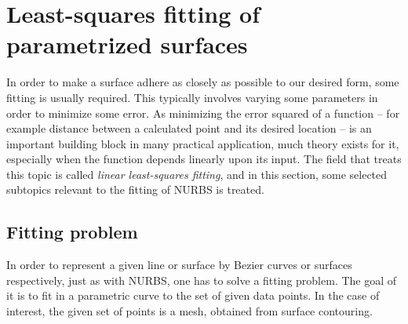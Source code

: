 \section{Least-squares fitting of parametrized surfaces}
In order to make a surface adhere as closely as possible to our desired form, some fitting is usually required. This typically involves varying some parameters in order to minimize some error. As minimizing the error squared of a function -- for example distance between a calculated point and its desired location -- is an important building block in many practical application, much theory exists for it, especially when the function depends linearly upon its input. The field that treats this topic is called \emph{linear least-squares fitting}, and in this section, some selected subtopics relevant to the fitting of \acs{NURBS} is treated.


\subsection{Fitting problem}
In order to represent a given line or surface by Bezier curves or surfaces respectively, just as with NURBS, one has to solve a fitting problem. The goal of it is to fit in a parametric curve to the set of given data points. In the case of interest, the given set of points is a mesh, obtained from surface contouring.
